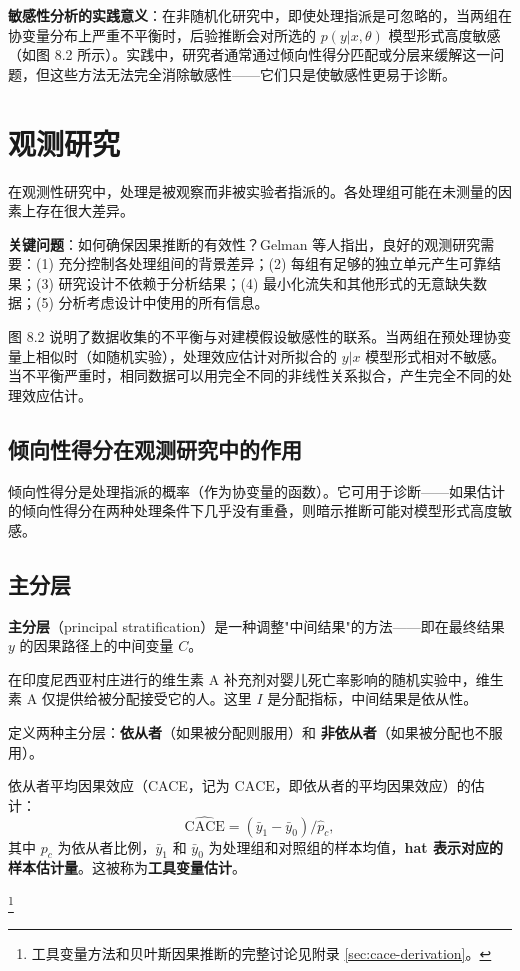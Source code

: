 \textbf{敏感性分析的实践意义}：在非随机化研究中，即使处理指派是可忽略的，当两组在协变量分布上严重不平衡时，后验推断会对所选的 $p(y|x,\theta)$ 模型形式高度敏感（如图 8.2 所示）。实践中，研究者通常通过倾向性得分匹配或分层来缓解这一问题，但这些方法无法完全消除敏感性——它们只是使敏感性更易于诊断。

\section{观测研究}

在观测性研究中，处理是被观察而非被实验者指派的。各处理组可能在未测量的因素上存在很大差异。

\textbf{关键问题}：如何确保因果推断的有效性？Gelman 等人指出，良好的观测研究需要：(1) 充分控制各处理组间的背景差异；(2) 每组有足够的独立单元产生可靠结果；(3) 研究设计不依赖于分析结果；(4) 最小化流失和其他形式的无意缺失数据；(5) 分析考虑设计中使用的所有信息。

图 8.2 说明了数据收集的不平衡与对建模假设敏感性的联系。当两组在预处理协变量上相似时（如随机实验），处理效应估计对所拟合的 $y|x$ 模型形式相对不敏感。当不平衡严重时，相同数据可以用完全不同的非线性关系拟合，产生完全不同的处理效应估计。

\subsection{倾向性得分在观测研究中的作用}

倾向性得分是处理指派的概率（作为协变量的函数）。它可用于诊断——如果估计的倾向性得分在两种处理条件下几乎没有重叠，则暗示推断可能对模型形式高度敏感。

\subsection{主分层}

\textbf{主分层}（principal stratification）是一种调整"中间结果"的方法——即在最终结果 $y$ 的因果路径上的中间变量 $C$。

\begin{Example}[有依从性问题的随机实验]
  在印度尼西亚村庄进行的维生素 A 补充剂对婴儿死亡率影响的随机实验中，维生素 A 仅提供给被分配接受它的人。这里 $I$ 是分配指标，中间结果是依从性。

  定义两种主分层：\textbf{依从者}（如果被分配则服用）和 \textbf{非依从者}（如果被分配也不服用）。

  依从者平均因果效应（CACE，记为 $\mathrm{CACE}$，即依从者的平均因果效应）的估计：
  \begin{equation}
    \widehat{\mathrm{CACE}} = (\bar{y}_1 - \bar{y}_0) / \hat{p}_c, \label{eq:ch8-cace-estimate}
  \end{equation}
  其中 $p_c$ 为依从者比例，$\bar{y}_1$ 和 $\bar{y}_0$ 为处理组和对照组的样本均值，\textbf{hat 表示对应的样本估计量}。这被称为\textbf{工具变量估计}。
\end{Example}\footnote{工具变量方法和贝叶斯因果推断的完整讨论见附录 \cref{sec:cace-derivation}。}

